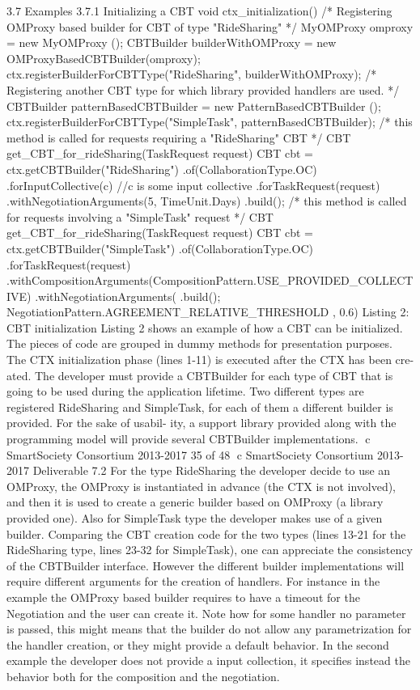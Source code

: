 3.7 Examples
3.7.1 Initializing a CBT
void ctx_initialization() {
/* Registering OMProxy based builder for CBT of type "RideSharing" */ MyOMProxy omproxy = new MyOMProxy ();
CBTBuilder builderWithOMProxy = new OMProxyBasedCBTBuilder(omproxy); ctx.registerBuilderForCBTType("RideSharing", builderWithOMProxy);
/* Registering another CBT type for which library provided handlers are used. */
CBTBuilder patternBasedCBTBuilder = new PatternBasedCBTBuilder ();
ctx.registerBuilderForCBTType("SimpleTask", patternBasedCBTBuilder); }
/* this method is called for requests requiring a "RideSharing" CBT */
CBT get_CBT_for_rideSharing(TaskRequest request) { CBT cbt =
ctx.getCBTBuilder("RideSharing") .of(CollaborationType.OC)
.forInputCollective(c) //c is some input collective .forTaskRequest(request) .withNegotiationArguments(5, TimeUnit.Days) .build();
}
/* this method is called for requests involving a "SimpleTask" request */
CBT get_CBT_for_rideSharing(TaskRequest request) { CBT cbt =
}
ctx.getCBTBuilder("SimpleTask")
.of(CollaborationType.OC)
.forTaskRequest(request) .withCompositionArguments(CompositionPattern.USE_PROVIDED_COLLECTIVE) .withNegotiationArguments(
.build();
NegotiationPattern.AGREEMENT_RELATIVE_THRESHOLD , 0.6)
Listing 2: CBT initialization
 Listing 2 shows an example of how a CBT can be initialized. The pieces of code are grouped in dummy methods for presentation purposes.
The CTX initialization phase (lines 1-11) is executed after the CTX has been cre- ated. The developer must provide a CBTBuilder for each type of CBT that is going to be used during the application lifetime. Two different types are registered RideSharing and SimpleTask, for each of them a different builder is provided. For the sake of usabil- ity, a support library provided along with the programming model will provide several CBTBuilder implementations.
⃝c SmartSociety Consortium 2013-2017 35 of 48
⃝c SmartSociety Consortium 2013-2017 Deliverable 7.2
For the type RideSharing the developer decide to use an OMProxy, the OMProxy is instantiated in advance (the CTX is not involved), and then it is used to create a generic builder based on OMProxy (a library provided one). Also for SimpleTask type the developer makes use of a given builder. Comparing the CBT creation code for the two types (lines 13-21 for the RideSharing type, lines 23-32 for SimpleTask), one can appreciate the consistency of the CBTBuilder interface. However the different builder implementations will require different arguments for the creation of handlers. For instance in the example the OMProxy based builder requires to have a timeout for the Negotiation and the user can create it. Note how for some handler no parameter is passed, this might means that the builder do not allow any parametrization for the handler creation, or they might provide a default behavior. In the second example the developer does not provide a input collection, it specifies instead the behavior both for the composition and the negotiation.
